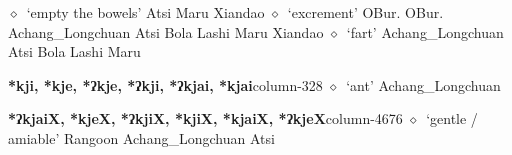 \hspace{1ex}
         $\diamond$~`empty the bowels'
         Atsi 
\hspace{1ex}
         Maru 
\hspace{1ex}
         Xiandao 
\hspace{1ex}
         $\diamond$~`excrement'
         OBur. 
\hspace{1ex}
         OBur. 
\hspace{1ex}
         Achang\_Longchuan 
\hspace{1ex}
         Atsi 
\hspace{1ex}
         Bola 
\hspace{1ex}
         Lashi 
\hspace{1ex}
         Maru 
\hspace{1ex}
         Xiandao 
\hspace{1ex}
         $\diamond$~`fart'
         Achang\_Longchuan 
\hspace{1ex}
         Atsi 
\hspace{1ex}
         Bola 
\hspace{1ex}
         Lashi 
\hspace{1ex}
         Maru 
  \item {\footnotesize \textbf{*kji, *kje, *ʔkje, *ʔkji, *ʔkjai, *kjai}}{\tiny column-328}
         $\diamond$~`ant'
         Achang\_Longchuan 
  \item {\footnotesize \textbf{*ʔkjaiX, *kjeX, *ʔkjiX, *kjiX, *kjaiX, *ʔkjeX}}{\tiny column-4676}
         $\diamond$~`gentle / amiable'
         Rangoon 
\hspace{1ex}
         Achang\_Longchuan 
\hspace{1ex}
         Atsi 
